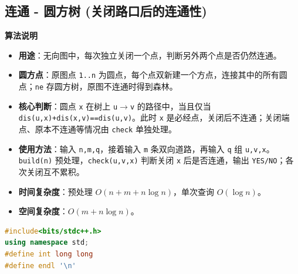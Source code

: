 \documentclass[10pt,landscape,a4paper]{article}
\begin{document}
\begin{multicols*}{3}
\subsection*{连通 - 圆方树 (关闭路口后的连通性)}
\par\addvspace{0.7ex}\noindent\textbf{算法说明}\par\nobreak
\begin{itemize}
\item \textbf{用途}：无向图中，每次独立关闭一个点，判断另外两个点是否仍然连通。
\item \textbf{圆方点}：原图点 \texttt{1\allowbreak{}.\allowbreak{}.\allowbreak{}n} 为圆点，每个点双新建一个方点，连接其中的所有圆点；\texttt{n\allowbreak{}e} 存圆方树，原图不连通时得到森林。
\item \textbf{核心判断}：圆点 \texttt{x} 在树上 \texttt{u\allowbreak{}\ensuremath{\to}\allowbreak{}v} 的路径中，当且仅当 \texttt{d\allowbreak{}i\allowbreak{}s\allowbreak{}(\allowbreak{}u\allowbreak{},\allowbreak{}x\allowbreak{})\allowbreak{}+\allowbreak{}d\allowbreak{}i\allowbreak{}s\allowbreak{}(\allowbreak{}x\allowbreak{},\allowbreak{}v\allowbreak{})\allowbreak{}=\allowbreak{}=\allowbreak{}d\allowbreak{}i\allowbreak{}s\allowbreak{}(\allowbreak{}u\allowbreak{},\allowbreak{}v\allowbreak{})}。此时 \texttt{x} 是必经点，关闭后不连通；关闭端点、原本不连通等情况由 \texttt{c\allowbreak{}h\allowbreak{}e\allowbreak{}c\allowbreak{}k} 单独处理。
\item \textbf{使用方法}：输入 \texttt{n\allowbreak{},\allowbreak{}m\allowbreak{},\allowbreak{}q}，接着输入 \texttt{m} 条双向道路，再输入 \texttt{q} 组 \texttt{u\allowbreak{},\allowbreak{}v\allowbreak{},\allowbreak{}x}。\texttt{b\allowbreak{}u\allowbreak{}i\allowbreak{}l\allowbreak{}d\allowbreak{}(\allowbreak{}n\allowbreak{})} 预处理，\texttt{c\allowbreak{}h\allowbreak{}e\allowbreak{}c\allowbreak{}k\allowbreak{}(\allowbreak{}u\allowbreak{},\allowbreak{}v\allowbreak{},\allowbreak{}x\allowbreak{})} 判断关闭 \texttt{x} 后是否连通，输出 \texttt{Y\allowbreak{}E\allowbreak{}S\allowbreak{}/\allowbreak{}N\allowbreak{}O}；各次关闭互不累积。
\item \textbf{时间复杂度}：预处理 $O(n+m+n\log n)$，单次查询 $O(\log n)$。
\item \textbf{空间复杂度}：$O(m+n\log n)$。
\end{itemize}
\par{}\par
\begin{lstlisting}[language=C++]
#include<bits/stdc++.h>
using namespace std;
#define int long long
#define endl '\n'


\end{lstlisting}
\end{multicols*}
\end{document}
